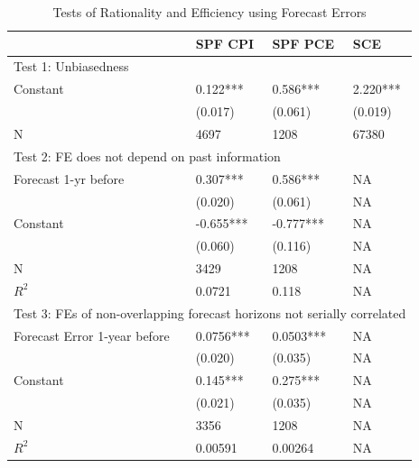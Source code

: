 \documentclass[12pt]{article}
\begin{document}
	\begin{table}[ht]
		\caption{Tests of Rationality and Efficiency using Forecast Errors}
		\label{NullTestTable}
		\centering 
		\begin{tabular}{llll}
			\hline 
			& SPF CPI          & SPF PCE          & SCE            \\
			\hline 
			\multicolumn{4}{l}{Test 1: Unbiasedness}                                                           \\
			\hline 
			Constant                            & 0.122***         & 0.586***         & 2.220***       \\
			& (0.017)          & (0.061)          & (0.019)        \\
			\hline 
			N                                   & 4697             & 1208             & 67380          \\
			\hline 
			\multicolumn{4}{l}{Test 2: FE does not depend on past information}                                  \\
			\hline 
			Forecast 1-yr before                & 0.307***         & 0.586***         & NA             \\
			& (0.020)          & (0.061)          & NA             \\
			Constant                            & -0.655***        & -0.777***        & NA             \\
			& (0.060)          & (0.116)          & NA             \\
			\hline 
			N                                   & 3429             & 1208             & NA             \\
			$R^2$                 & 0.0721           & 0.118            & NA             \\
			\hline 
			\multicolumn{4}{l}{Test 3: FEs of non-overlapping forecast horizons not serially correlated} \\
			\hline 
			Forecast Error 1-year before        & 0.0756***        & 0.0503***        & NA             \\
			& (0.020)          & (0.035)          & NA             \\
			Constant                            & 0.145***         & 0.275***         & NA             \\
			& (0.021)          & (0.035)          & NA             \\
			\hline 
			N                                   & 3356             & 1208             & NA             \\
			$R^2$                   & 0.00591          & 0.00264          & NA             \\

\end{tabular}
\end{table}
\end{document}
